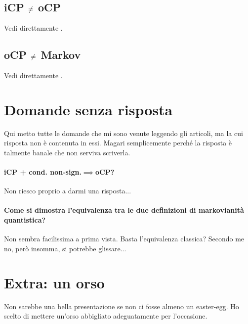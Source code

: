 \documentclass[a4]{article}
\begin{document}
\subsection[iCP non è equivalente a oCP]
           {iCP \(\centernot=\) oCP} \label{cont:icpocp}
Vedi direttamente \cite{CPdoesnotimply}.

\subsection[oCP non è equivalente a Markoviano]
           {oCP \(\centernot=\) Markov} \label{cont:ocpmar}
Vedi direttamente \cite{CPdoesnotimply}.

\section{Domande senza risposta}
Qui metto tutte le domande che mi sono venute leggendo gli articoli, ma la cui risposta
non è contenuta in essi. Magari semplicemente perché la risposta è talmente
banale che non serviva scriverla.
\paragraph{iCP + cond. non-sign.\(\implies\)oCP?} 
Non riesco proprio a darmi una risposta...

\paragraph{Come si dimostra l'equivalenza tra le due definizioni di markovianità quantistica?}
Non sembra facilissima a prima vista. Basta l'equivalenza classica? Secondo me no, però
insomma, si potrebbe glissare... 

\printbibliography

\section{Extra: un orso}
Non sarebbe una bella presentazione se non ci fosse almeno un easter-egg. Ho scelto
di mettere un'orso abbigliato adeguatamente per l'occasione.
~
\begin{figure}[h!]
	\centering
	\resizebox{0.9\textwidth}{!}{}
\end{figure}
	
\begin{figure}[h!]
	\centering
	\resizebox{0.9\textwidth}{!}{}
\end{figure}
\end{document}
